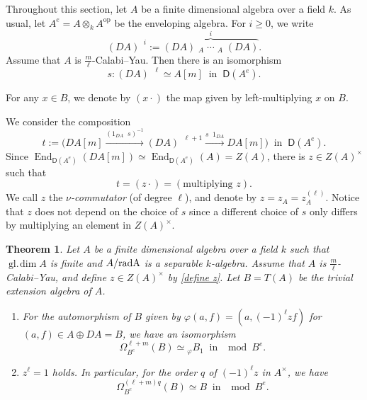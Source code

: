\documentclass[a4paper,reqno,11pt]{amsart}
\newtheorem{theorem}{Theorem}[section]
\theoremstyle{definition}
\newcommand{\DDD}{\mathsf{D}}
\newcommand{\End}{\operatorname{End}\nolimits}
\newcommand{\gl}{\operatorname{gl.\!dim}\nolimits}
\newcommand{\op}{\operatorname{op}\nolimits}
\newcommand{\Lotimes}{\mathop{\stackrel{\mathbf{L}}{\otimes}}\nolimits}
\newcommand{\new}[1]{{\blue #1}}
\numberwithin{equation}{section}
\begin{document}
Throughout this section, let $A$ be a finite dimensional algebra over a field $k$. As usual, let $A^e=A\otimes_kA^{\op}$ be the enveloping algebra. For $i\ge0$, we write
\[(DA)^{\Lotimes i}:=\overbrace{(DA)\Lotimes_A\cdots\Lotimes_A(DA)}^i.\]
Assume that $A$ is $\frac{m}{\ell}$-Calabi--Yau. Then there is an isomorphism
\begin{equation}\label{define s}
s:(DA)^{\Lotimes\ell}\simeq A[m]\ \mbox{ in }\ \DDD(A^e).
\end{equation}

For any $x\in B$, we denote by $(x\cdot)$ the map given by left-multiplying $x$ on $B$.

We consider the composition
\begin{equation}\label{define t}
t:=\Big(DA[m]\xrightarrow{(1_{DA}\Lotimes s)^{-1}}(DA)^{\Lotimes\ell+1}\xrightarrow{s\Lotimes1_{DA}}DA[m]\Big)\ \mbox{ in }\ \DDD(A^e).
\end{equation}
Since $\End_{\DDD(A^e)}(DA[m])\simeq\End_{\DDD(A^e)}(A)=Z(A)$, there is $z\in Z(A)^\times$ such that
\begin{equation}\label{define z}
t=(z\cdot)=(\text{multiplying }z).
\end{equation}
\new{We call $z$ the \emph{$\nu$-commutator} (of degree $\ell$), and denote by $z=z_A=z_A^{(\ell)}$.}
Notice that $z$ does not depend on the choice of $s$ since a different choice of $s$ only differs by multiplying an element in $Z(A)^\times$.

\begin{theorem}\label{trivial extension is periodic}
Let $A$ be a finite dimensional algebra over a field $k$ such that $\gl A$ is finite and $A/{\rm rad A}$ is a separable $k$-algebra.
Assume that $A$ is $\frac{m}{\ell}$-Calabi--Yau, and define $z\in Z(A)^\times$ by \eqref{define z}.
Let $B=T(A)$ be the trivial extension algebra of $A$.
\begin{enumerate}[\rm(a)]
\item For the automorphism of $B$ given by $\varphi(a,f)=(a,(-1)^\ell zf)$ for $(a,f)\in A\oplus DA=B$, we have an isomorphism
\[\Omega^{\ell+m}_{B^e}(B)\simeq{}_\varphi B_1\ \mbox{ in }\mod B^e.\]
\item $z^\ell=1$ holds. In particular, for the order $q$ of $(-1)^\ell z$ in $A^\times$, we have
\[\Omega^{(\ell+m)q}_{B^e}(B)\simeq B\ \mbox{ in }\mod B^e.\]
\end{enumerate}
\end{theorem}
\end{document}
